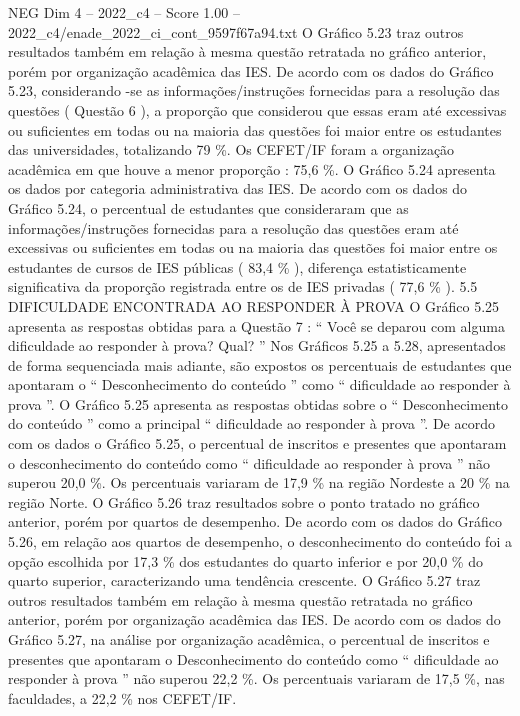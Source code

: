\begin{textsample}{NEG Dim 4 – 2022\_c4 – Score 1.00 – 2022\_c4/enade\_2022\_ci\_cont\_9597f67a94.txt}
O Gráfico 5.23 traz outros resultados também em relação à mesma questão retratada no gráfico anterior, porém por organização acadêmica das IES.
De acordo com os dados do Gráfico 5.23, considerando -se as informações/instruções fornecidas para a resolução das questões ( Questão 6 ), a proporção que considerou que essas eram até excessivas ou suficientes em todas ou na maioria das questões foi maior entre os estudantes das universidades, totalizando 79 \%.
Os CEFET/IF foram a organização acadêmica em que houve a menor proporção : 75,6 \%.
O Gráfico 5.24 apresenta os dados por categoria administrativa das IES.
De acordo com os dados do Gráfico 5.24, o percentual de estudantes que consideraram que as informações/instruções fornecidas para a resolução das questões eram até excessivas ou suficientes em todas ou na maioria das questões foi maior entre os estudantes de cursos de IES públicas ( 83,4 \% ), diferença estatisticamente significativa da proporção registrada entre os de IES privadas ( 77,6 \% ). 5.5 DIFICULDADE ENCONTRADA AO RESPONDER À PROVA O Gráfico 5.25 apresenta as respostas obtidas para a Questão 7 : “ Você se deparou com alguma dificuldade ao responder à prova?
Qual? ” Nos Gráficos 5.25 a 5.28, apresentados de forma sequenciada mais adiante, são expostos os percentuais de estudantes que apontaram o “ Desconhecimento do conteúdo ” como “ dificuldade ao responder à prova ”.
O Gráfico 5.25 apresenta as respostas obtidas sobre o “ Desconhecimento do conteúdo ” como a principal “ dificuldade ao responder à prova ”.
De acordo com os dados o Gráfico 5.25, o percentual de inscritos e presentes que apontaram o desconhecimento do conteúdo como “ dificuldade ao responder à prova ” não superou 20,0 \%.
Os percentuais variaram de 17,9 \% na região Nordeste a 20 \% na região Norte.
O Gráfico 5.26 traz resultados sobre o ponto tratado no gráfico anterior, porém por quartos de desempenho.
De acordo com os dados do Gráfico 5.26, em relação aos quartos de desempenho, o desconhecimento do conteúdo foi a opção escolhida por 17,3 \% dos estudantes do quarto inferior e por 20,0 \% do quarto superior, caracterizando uma tendência crescente.
O Gráfico 5.27 traz outros resultados também em relação à mesma questão retratada no gráfico anterior, porém por organização acadêmica das IES.
De acordo com os dados do Gráfico 5.27, na análise por organização acadêmica, o percentual de inscritos e presentes que apontaram o Desconhecimento do conteúdo como “ dificuldade ao responder à prova ” não superou 22,2 \%.
Os percentuais variaram de 17,5 \%, nas faculdades, a 22,2 \% nos CEFET/IF.

\end{textsample}
